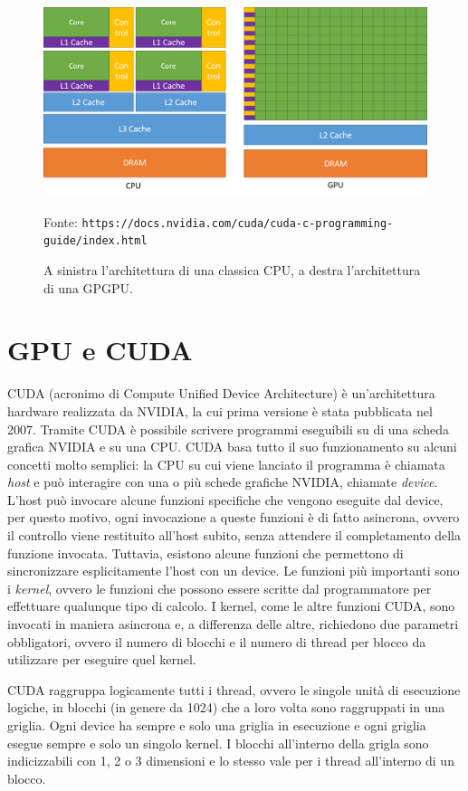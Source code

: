 \documentclass[12pt,a4paper]{book}
\newcommand{\source}[1]{\caption*{Fonte: {\small\texttt{#1}}} }
\begin{document}
	\begin{figure}[!ht]
		\centering
		\includegraphics[width=0.7\linewidth]{cpu-gpu-computing-architecture}
		\caption[Differenza architetturale tra CPU e GPU]{A sinistra l'architettura di una classica CPU, a destra l'architettura di una GPGPU.}
		\source{https://docs.nvidia.com/cuda/cuda-c-programming-guide/index.html}
		\label{fig:cpu-gpu-computing-architecture}
	\end{figure}
	
	\section{GPU e CUDA}
	CUDA (acronimo di Compute Unified Device Architecture) è un'architettura hardware realizzata da NVIDIA, la cui prima versione è stata pubblicata nel 2007. Tramite CUDA è possibile scrivere programmi eseguibili su di una scheda grafica NVIDIA e su una CPU. CUDA basa tutto il suo funzionamento su alcuni concetti molto semplici: la CPU su cui viene lanciato il programma è chiamata \textit{host} e può interagire con una o più schede grafiche NVIDIA, chiamate \textit{device}. L'host può invocare alcune funzioni specifiche che vengono eseguite dal device, per questo motivo, ogni invocazione a queste funzioni è di fatto asincrona, ovvero il controllo viene restituito all'host subito, senza attendere il completamento della funzione invocata. Tuttavia, esistono alcune funzioni che permettono di sincronizzare esplicitamente l'host con un device. Le funzioni più importanti sono i \textit{kernel}, ovvero le funzioni che possono essere scritte dal programmatore per effettuare qualunque tipo di calcolo. I kernel, come le altre funzioni CUDA, sono invocati in maniera asincrona e, a differenza delle altre, richiedono due parametri obbligatori, ovvero il numero di blocchi e il numero di thread per blocco da utilizzare per eseguire quel kernel.
	
	CUDA raggruppa logicamente tutti i thread, ovvero le singole unità di esecuzione logiche, in blocchi (in genere da 1024) che a loro volta sono raggruppati in una griglia. Ogni device ha sempre e solo una griglia in esecuzione e ogni griglia esegue sempre e solo un singolo kernel. I blocchi all'interno della grigla sono indicizzabili con 1, 2 o 3 dimensioni e lo stesso vale per i thread all'interno di un blocco.
	
\end{document}
